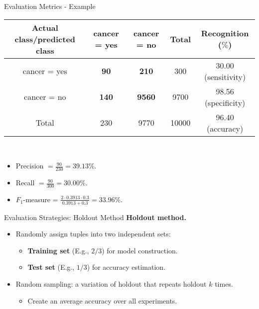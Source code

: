 \begin{frame}{Evaluation Metrics - Example}
	\centering
	\begin{tabular}{|c|c|c|c|c|}
		\hline
		Actual class/predicted class & cancer = yes & cancer = no   & Total & Recognition ($\%$)  \\\hline
		cancer = yes                 & \textbf{90}  & \textbf{210}  & 300   & 30.00 (sensitivity) \\\hline
		cancer = no                  & \textbf{140} & \textbf{9560} & 9700  & 98.56 (specificity) \\\hline
		Total                        & 230          & 9770          & 10000 & 96.40 (accuracy)    \\\hline
	\end{tabular}\\[0.2cm]
	\begin{itemize}
		\item Precision $= \frac{90}{230} = 39.13 \%$.
		\item Recall $=\frac{90}{300} = 30.00 \%$.
		\item $F_1$-measure = $\frac{2 \cdot 0.3913 \cdot 0.3}{0.3913 + 0.3} = 33.96 \%$.
	\end{itemize}
\end{frame}

\begin{frame}{Evaluation Strategies: Holdout Method}
	\textbf{Holdout method.}
	\begin{itemize}
		\item Randomly assign tuples into two independent sets:
		      \begin{itemize}
			      \item \textbf{\color{airforceblue}Training set} (E.g., $2/3$) for model construction.
			      \item \textbf{\color{airforceblue}Test set} (E.g., $1/3$) for accuracy estimation.
		      \end{itemize}
		\item Random sampling: a variation of holdout that repeats holdout $k$ times.
		      \begin{itemize}
			      \item Create an average accuracy over all experiments.
		      \end{itemize}
	\end{itemize}

\end{frame}

